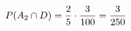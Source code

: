 \documentclass[preview]{standalone}
\begin{document}
\begin{align*}
\special{dvisvgm:raw <g id='unique000'>}P(A_2\cap D)=\frac25\cdot\frac3{100}=\frac3{250}\special{dvisvgm:raw </g>}
\end{align*}
\end{document}
